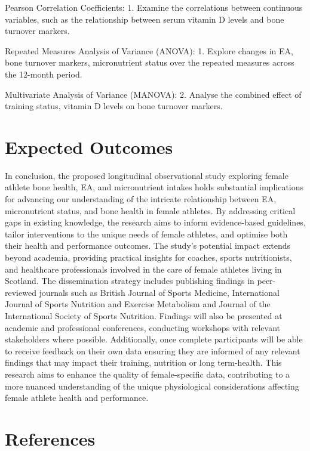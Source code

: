 \documentclass[
]{article}
\begin{document}
Pearson Correlation Coefficients:
1. Examine the correlations between continuous variables, such as the relationship between serum vitamin D levels and bone turnover markers.

Repeated Measures Analysis of Variance (ANOVA):
1. Explore changes in EA, bone turnover markers, micronutrient status over the repeated measures across the 12-month period.

Multivariate Analysis of Variance (MANOVA):
2. Analyse the combined effect of training status, vitamin D levels on bone turnover markers.

\section{Expected Outcomes}\label{expected-outcomes-1}

In conclusion, the proposed longitudinal observational study exploring female athlete bone health, EA, and micronutrient intakes holds substantial implications for advancing our understanding of the intricate relationship between EA, micronutrient status, and bone health in female athletes. By addressing critical gaps in existing knowledge, the research aims to inform evidence-based guidelines, tailor interventions to the unique needs of female athletes, and optimise both their health and performance outcomes. The study's potential impact extends beyond academia, providing practical insights for coaches, sports nutritionists, and healthcare professionals involved in the care of female athletes living in Scotland. The dissemination strategy includes publishing findings in peer-reviewed journals such as British Journal of Sports Medicine, International Journal of Sports Nutrition and Exercise Metabolism and Journal of the International Society of Sports Nutrition. Findings will also be presented at academic and professional conferences, conducting workshops with relevant stakeholders where possible. Additionally, once complete participants will be able to receive feedback on their own data ensuring they are informed of any relevant findings that may impact their training, nutrition or long term-health. This research aims to enhance the quality of female-specific data, contributing to a more nuanced understanding of the unique physiological considerations affecting female athlete health and performance.

\section{References}\label{references}
\end{document}
